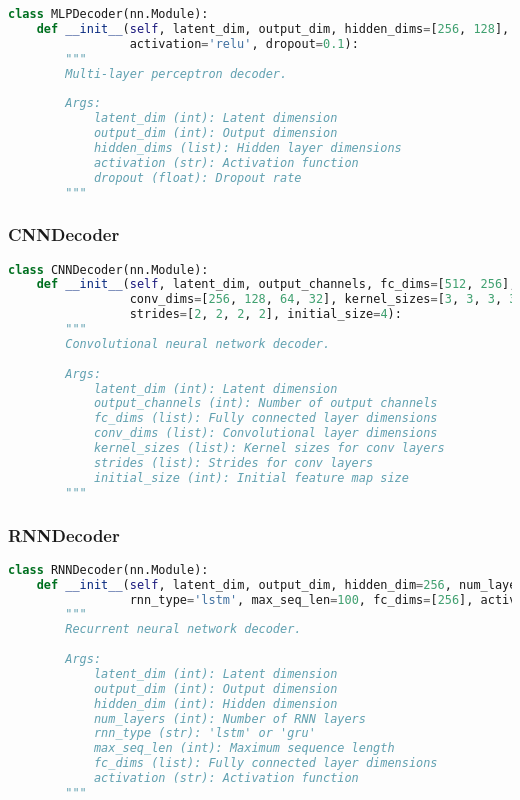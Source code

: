 \begin{lstlisting}[language=python]
class MLPDecoder(nn.Module):
    def __init__(self, latent_dim, output_dim, hidden_dims=[256, 128],
                 activation='relu', dropout=0.1):
        """
        Multi-layer perceptron decoder.
        
        Args:
            latent_dim (int): Latent dimension
            output_dim (int): Output dimension
            hidden_dims (list): Hidden layer dimensions
            activation (str): Activation function
            dropout (float): Dropout rate
        """
\end{lstlisting}

\subsubsection{CNNDecoder}

\begin{lstlisting}[language=python]
class CNNDecoder(nn.Module):
    def __init__(self, latent_dim, output_channels, fc_dims=[512, 256],
                 conv_dims=[256, 128, 64, 32], kernel_sizes=[3, 3, 3, 3],
                 strides=[2, 2, 2, 2], initial_size=4):
        """
        Convolutional neural network decoder.
        
        Args:
            latent_dim (int): Latent dimension
            output_channels (int): Number of output channels
            fc_dims (list): Fully connected layer dimensions
            conv_dims (list): Convolutional layer dimensions
            kernel_sizes (list): Kernel sizes for conv layers
            strides (list): Strides for conv layers
            initial_size (int): Initial feature map size
        """
\end{lstlisting}

\subsubsection{RNNDecoder}

\begin{lstlisting}[language=python]
class RNNDecoder(nn.Module):
    def __init__(self, latent_dim, output_dim, hidden_dim=256, num_layers=2,
                 rnn_type='lstm', max_seq_len=100, fc_dims=[256], activation='relu'):
        """
        Recurrent neural network decoder.
        
        Args:
            latent_dim (int): Latent dimension
            output_dim (int): Output dimension
            hidden_dim (int): Hidden dimension
            num_layers (int): Number of RNN layers
            rnn_type (str): 'lstm' or 'gru'
            max_seq_len (int): Maximum sequence length
            fc_dims (list): Fully connected layer dimensions
            activation (str): Activation function
        """
\end{lstlisting}

